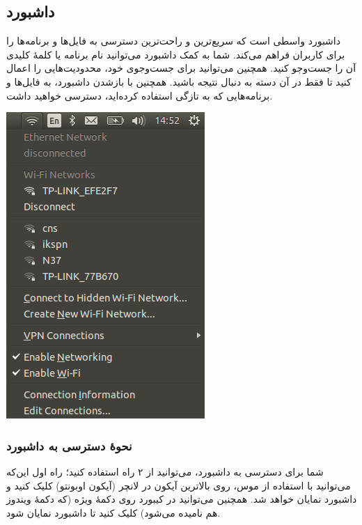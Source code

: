 \subsection{داشبورد}
داشبورد واسطی است که سریع‌ترین و راحت‌ترین دسترسی به فایل‌ها و برنامه‌ها را برای کاربران فراهم می‌کند. شما به کمک داشبورد می‌توانید نام برنامه یا کلمهٔ کلیدی آن را جست‌وجو کنید. همچنین می‌توانید برای جست‌وجوی خود، محدودیت‌هایی را اعمال کنید تا فقط در آن دسته به دنبال نتیجه باشید. همچنین با بازشدن داشبورد، به فایل‌ها و برنامه‌هایی که به تازگی استفاده کرده‌اید، دسترسی خواهید داشت.
\begin{center}
\includegraphics[scale=0.43]{pics/19.png}
\end{center}

\subsubsection{نحوهٔ دسترسی به داشبورد}
شما برای دسترسی به داشبورد، می‌توانید از ۲ راه استفاده کنید؛ راه اول این‌که می‌توانید با استفاده از موس، روی بالاترین آیکون در لانچر (آیکون اوبونتو) کلیک کنید و داشبورد نمایان خواهد شد. همچنین می‌توانید در کیبورد روی دکمهٔ ویژه (که دکمهٔ ویندوز هم نامیده می‌شود) کلیک کنید تا داشبورد نمایان شود.


